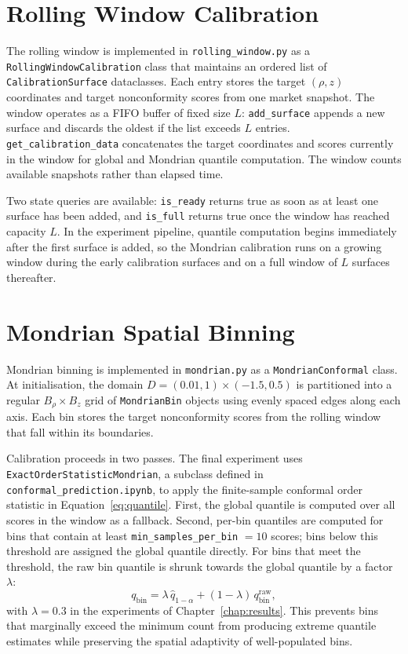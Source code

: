 \section{Rolling Window Calibration}
\label{sec:impl_rolling}

The rolling window is implemented in \texttt{rolling\_window.py} as a \texttt{RollingWindowCalibration} class that maintains an ordered list of \texttt{CalibrationSurface} dataclasses. Each entry stores the target $(\rho,z)$ coordinates and target nonconformity scores from one market snapshot. The window operates as a FIFO buffer of fixed size $L$: \texttt{add\_surface} appends a new surface and discards the oldest if the list exceeds $L$ entries. \texttt{get\_calibration\_data} concatenates the target coordinates and scores currently in the window for global and Mondrian quantile computation. The window counts available snapshots rather than elapsed time.

Two state queries are available: \texttt{is\_ready} returns true as soon as at least one surface has been added, and \texttt{is\_full} returns true once the window has reached capacity $L$. In the experiment pipeline, quantile computation begins immediately after the first surface is added, so the Mondrian calibration runs on a growing window during the early calibration surfaces and on a full window of $L$ surfaces thereafter.

\section{Mondrian Spatial Binning}
\label{sec:impl_mondrian}

Mondrian binning is implemented in \texttt{mondrian.py} as a \texttt{MondrianConformal} class. At initialisation, the domain $D = (0.01, 1) \times (-1.5, 0.5)$ is partitioned into a regular $B_\rho \times B_z$ grid of \texttt{MondrianBin} objects using evenly spaced edges along each axis. Each bin stores the target nonconformity scores from the rolling window that fall within its boundaries.

Calibration proceeds in two passes. The final experiment uses \texttt{ExactOrderStatisticMondrian}, a subclass defined in \texttt{conformal\_prediction.ipynb}, to apply the finite-sample conformal order statistic in Equation~\ref{eq:quantile}. First, the global quantile is computed over all scores in the window as a fallback. Second, per-bin quantiles are computed for bins that contain at least \texttt{min\_samples\_per\_bin} $= 10$ scores; bins below this threshold are assigned the global quantile directly. For bins that meet the threshold, the raw bin quantile is shrunk towards the global quantile by a factor $\lambda$:
\begin{equation}
    q_{\text{bin}} = \lambda\, \hat{q}_{1-\alpha} + (1 - \lambda)\, q^{\text{raw}}_{\text{bin}},
\end{equation}
with $\lambda = 0.3$ in the experiments of Chapter~\ref{chap:results}. This prevents bins that marginally exceed the minimum count from producing extreme quantile estimates while preserving the spatial adaptivity of well-populated bins.


